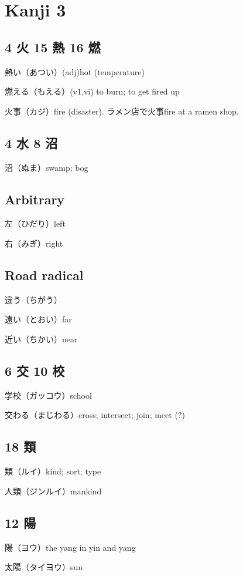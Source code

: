 \chapter{Kanji 3}

\section{4 火 15 熱 16 燃}

熱い（あつい）(adj)hot (temperature)

燃える（もえる）(v1,vi) to burn; to get fired up

火事（カジ）fire (disaster).
ラメン店で火事fire at a ramen shop.

\section{4 水 8 沼}

沼（ぬま）swamp; bog

\section{Arbitrary}

左（ひだり）left

右（みぎ）right

\section{Road radical}

違う（ちがう）

遠い（とおい）far

近い（ちかい）near

\section{6 交 10 校}

学校（ガッコウ）school

交わる（まじわる）cross; intersect; join; meet (?)

\section{18 類}

類（ルイ）kind; sort; type

人類（ジンルイ）mankind

\section{12 陽}

陽（ヨウ）the yang in yin and yang

太陽（タイヨウ）sun
